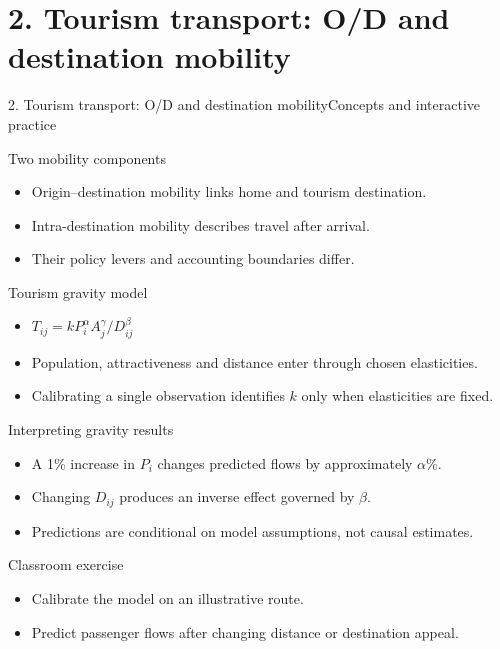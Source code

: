 \documentclass[aspectratio=169,11pt]{beamer}
\begin{document}
\section{2. Tourism transport: O/D and destination mobility}
\begin{frame}{2. Tourism transport: O/D and destination mobility}\centering\Large Concepts and interactive practice\end{frame}
\begin{frame}{Two mobility components}\begin{itemize}
\item Origin--destination mobility links home and tourism destination.
\item Intra-destination mobility describes travel after arrival.
\item Their policy levers and accounting boundaries differ.
\end{itemize}\end{frame}
\begin{frame}{Tourism gravity model}\begin{itemize}
\item $T_{ij}=k P_i^{\alpha} A_j^{\gamma}/D_{ij}^{\beta}$
\item Population, attractiveness and distance enter through chosen elasticities.
\item Calibrating a single observation identifies $k$ only when elasticities are fixed.
\end{itemize}\end{frame}
\begin{frame}{Interpreting gravity results}\begin{itemize}
\item A 1\% increase in $P_i$ changes predicted flows by approximately $\alpha$\%.
\item Changing $D_{ij}$ produces an inverse effect governed by $\beta$.
\item Predictions are conditional on model assumptions, not causal estimates.
\end{itemize}\end{frame}
\begin{frame}{Classroom exercise}\begin{itemize}
\item Calibrate the model on an illustrative route.
\item Predict passenger flows after changing distance or destination appeal.
\end{itemize}\end{frame}
\end{document}
